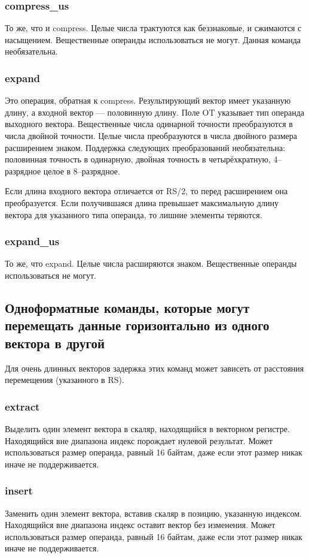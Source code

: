 \documentclass[forwardcom.tex]{subfiles}
\begin{document}
\subsubsection{compress\_us}
То же, что и compress. Целые числа трактуются как беззнаковые, и сжимаются с насыщением. Вещественные операнды использоваться не могут. Данная команда необязательна.

\subsubsection{expand}
Это операция, обратная к compress. Результирующий вектор имеет указанную длину, а входной вектор --- половинную длину. Поле OT указывает тип операнда выходного вектора. Вещественные числа одинарной точности преобразуются в числа двойной точности. Целые числа преобразуются в числа двойного размера расширением знаком. Поддержка следующих преобразований необязательна: половинная точность в одинарную, двойная точность в четырёхкратную, 4--разрядное целое в 8--разрядное.

Если длина входного вектора отличается от RS/2, то перед расширением она преобразуется. Если получившаяся длина превышает максимальную длину вектора для указанного типа операнда, то лишние элементы теряются.

\subsubsection{expand\_us}
То же, что expand. Целые числа расширяются знаком. Вещественные операнды использоваться не могут.

\subsection{Одноформатные команды, которые могут перемещать данные горизонтально из одного вектора в другой}
Для очень длинных векторов задержка этих команд может зависеть от расстояния перемещения (указанного в RS).

\subsubsection{extract}
Выделить один элемент вектора в скаляр, находящийся в векторном регистре. Находящийся вне диапазона индекс порождает нулевой результат. Может использоваться размер операнда, равный 16 байтам, даже если этот размер никак иначе не поддерживается.

\subsubsection{insert}
Заменить один элемент вектора, вставив скаляр в позицию, указанную индексом. Находящийся вне диапазона индекс оставит вектор без изменения. Может использоваться размер операнда, равный 16 байтам, даже если этот размер никак иначе не поддерживается.
\end{document}
